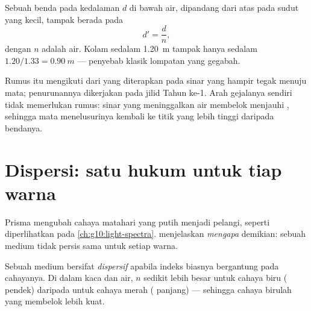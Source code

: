 \begin{proposition}\label{prop:g10:refraction:depth}
Sebuah benda pada kedalaman $d$ di bawah air, dipandang dari atas pada
sudut yang kecil, tampak berada pada \emph{}
\[
d' = \frac{d}{n} ,
\]
dengan $n$ adalah  air. Kolam sedalam \qty{1.20}{m} tampak
hanya sedalam $1.20/1.33 = \qty{0.90}{m}$ --- penyebab klasik lompatan
yang gegabah.
\end{proposition}
\admitted

\begin{remark}\label{rem:g10:refraction:depthhonest}
Rumus itu mengikuti dari  yang diterapkan pada sinar yang
hampir tegak menuju mata; penurunannya dikerjakan pada jilid Tahun ke-1.
Arah gejalanya sendiri tidak memerlukan rumus: sinar yang meninggalkan
air membelok menjauhi , sehingga mata menelusurinya kembali
ke titik yang lebih tinggi daripada bendanya.
\end{remark}

\section{Dispersi: satu hukum untuk tiap warna}

Prisma mengubah cahaya matahari yang putih menjadi pelangi, seperti
diperlihatkan  pada \cref{ch:g10:light-spectra}. 
menjelaskan \emph{mengapa} demikian:  sebuah medium tidak
persis sama untuk setiap warna.

\begin{definition}[Dispersi]\label{def:g10:refraction:dispersion}
Sebuah medium bersifat \emph{dispersif} apabila indeks
biasnya bergantung pada  cahayanya. Di dalam kaca dan
air, $n$ sedikit lebih besar untuk cahaya biru (
pendek) daripada untuk cahaya merah ( panjang) ---
sehingga cahaya birulah yang membelok lebih kuat.
\end{definition}

